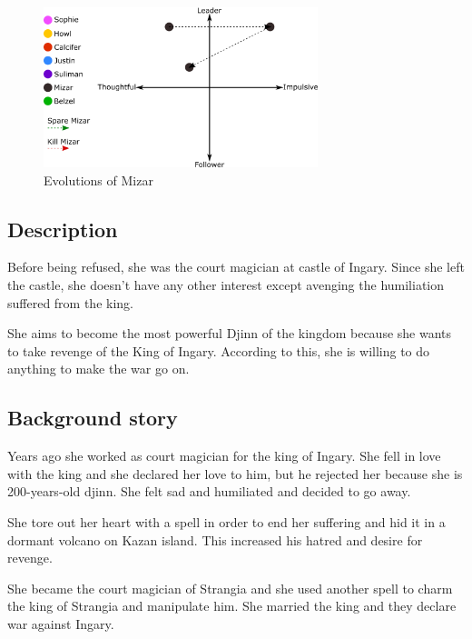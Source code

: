 \begin{figure}[H]
  \centering
  \includegraphics[width=8cm]{Images/Evolutions/mizarEvolution}
  \caption{Evolutions of Mizar}
\end{figure}

\subsection{Description}
Before being refused, she was the court magician at castle of Ingary. Since she left the castle, she doesn't have any other interest except avenging the humiliation suffered from the king.

She aims to become the most powerful Djinn of the kingdom because she wants to take revenge of the King of Ingary. According to this, she is willing to do anything to make the war go on.

\subsection{Background story}
Years ago she worked as court magician for the king of Ingary. She fell in love with the king and she declared her love to him, but he rejected her because she is 200-years-old djinn. She felt sad and humiliated and decided to go away.

She tore out her heart with a spell in order to end her suffering and hid it in a dormant volcano on Kazan island. This increased his hatred and desire for revenge.

She became the court magician of Strangia and she used another spell to charm the king of Strangia and manipulate him. She married the king and they declare war against Ingary.
